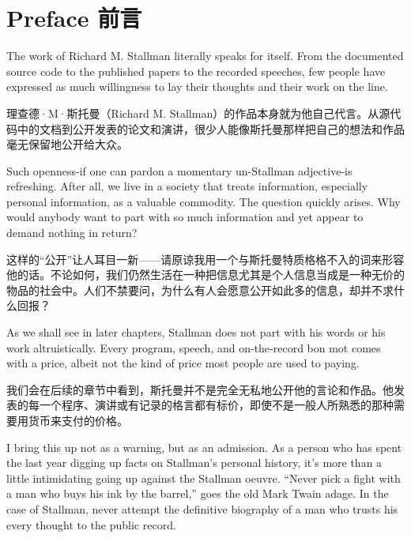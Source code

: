 \chapter{\ifdefined\eng
Preface
\fi
\ifdefined\chs
前言
\fi}
\thispagestyle{empty}

\ifdefined\eng
The work of Richard M. Stallman literally speaks for itself. From the documented source code to the published papers to the recorded speeches, few people have expressed as much willingness to lay their thoughts and their work on the line.
\fi

\ifdefined\chs
理查德·M·斯托曼（Richard M. Stallman）的作品本身就为他自己代言。从源代码中的文档到公开发表的论文和演讲，很少人能像斯托曼那样把自己的想法和作品毫无保留地公开给大众。
\fi

\ifdefined\eng
Such openness-if one can pardon a momentary un-Stallman adjective-is refreshing. After all, we live in a society that treats information, especially personal information, as a valuable commodity. The question quickly arises. Why would anybody want to part with so much information and yet appear to demand nothing in return?
\fi

\ifdefined\chs
这样的``公开''让人耳目一新——请原谅我用一个与斯托曼特质格格不入的词来形容他的话。不论如何，我们仍然生活在一种把信息尤其是个人信息当成是一种无价的物品的社会中。人们不禁要问，为什么有人会愿意公开如此多的信息，却并不求什么回报？
\fi

\ifdefined\eng
As we shall see in later chapters, Stallman does not part with his words or his work altruistically. Every program, speech, and on-the-record bon mot comes with a price, albeit not the kind of price most people are used to paying.
\fi

\ifdefined\chs
我们会在后续的章节中看到，斯托曼并不是完全无私地公开他的言论和作品。他发表的每一个程序、演讲或有记录的格言都有标价，即使不是一般人所熟悉的那种需要用货币来支付的价格。
\fi

\ifdefined\eng
I bring this up not as a warning, but as an admission. As a person who has spent the last year digging up facts on Stallman's personal history, it's more than a little intimidating going up against the Stallman oeuvre. ``Never pick a fight with a man who buys his ink by the barrel,'' goes the old Mark Twain adage. In the case of Stallman, never attempt the definitive biography of a man who trusts his every thought to the public record.
\fi

